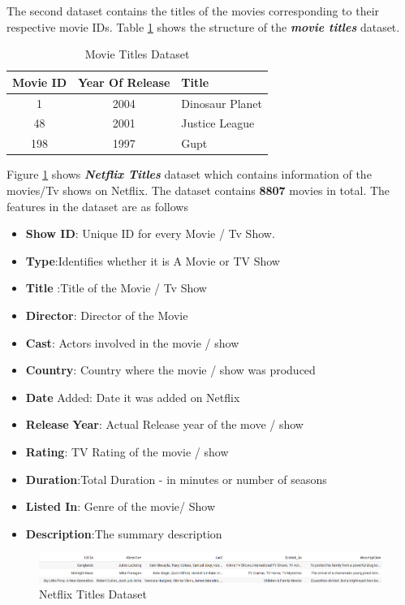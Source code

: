 \documentclass[a4paper,10pt]{article}
\begin{document}
The second dataset contains the titles of the movies corresponding to their respective movie IDs. Table \ref{Movie_titles} shows the structure of the \textit{\textbf{movie titles}} dataset. 

\begin{table}
    \centering
    \begin{tabular}{|c|c|l|} \hline 
         Movie ID& Year Of Release&Title\\ \hline 
         1& 2004&Dinosaur Planet\\ \hline 
         48&  2001&Justice League\\ \hline 
         198
&  1997&Gupt\\ \hline
    \end{tabular}
    \caption{Movie Titles Dataset}
    \label{Movie_titles}
\end{table}

\vspace{10pt}
Figure \ref{netflix titles} shows \textbf{\textit{Netflix Titles}} dataset which contains  information of the movies/Tv shows on Netflix. The dataset contains \textbf{8807} movies in total. The features in the dataset are as follows 
\begin{itemize}
    \item \textbf{Show ID}: Unique ID for every Movie / Tv Show. 
    \item \textbf{Type}:Identifies whether it is A Movie or TV Show 
    \item \textbf{Title} :Title of the Movie / Tv Show 
    \item \textbf{Director}: Director of the Movie
    \item \textbf{Cast}: Actors involved in the movie / show
    \item \textbf{Country}: Country where the movie / show was produced
    \item \textbf{Date} Added: Date it was added on Netflix
    \item \textbf{Release} \textbf{Year}: Actual Release year of the move / show
    \item \textbf{Rating}: TV Rating of the movie / show
    \item \textbf{Duration}:Total Duration - in minutes or number of seasons
    \item \textbf{Listed In}: Genre of the movie/ Show
    \item \textbf{Description}:The summary description 
\end{itemize}
\begin{figure}
    \centering
    \includegraphics[width=1\linewidth]{figures/netflix_title.png}
    \caption{Netflix Titles Dataset}
    \label{netflix titles}
\end{figure}
\end{document}

